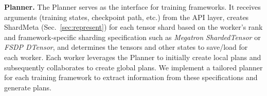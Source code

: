 


\noindent \textbf{Planner.}
The Planner serves as the interface for training frameworks.
It receives arguments (training states, checkpoint path, etc.) from the API layer, creates ShardMeta (Sec.~\ref{sec:represent}) for each tensor shard based on the worker's rank and framework-specific sharding specification such as \textit{Megatron ShardedTensor} or \textit{FSDP DTensor}, and determines the tensors and other states to save/load for each worker.
Each worker leverages the Planner to initially create local plans and subsequently collaborates to create global plans.
We implement a tailored planner for each training framework to extract information from these specifications and generate plans.


